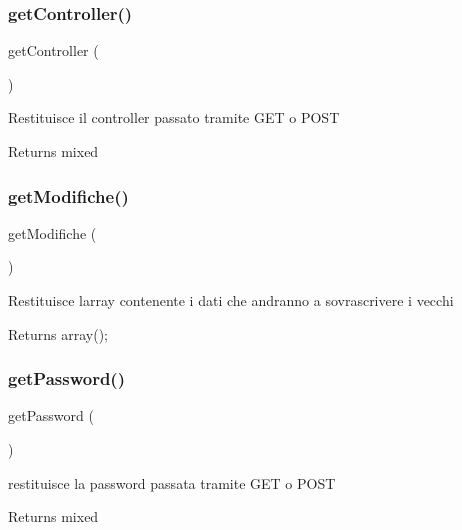 \subsubsection{\texorpdfstring{get\+Controller()}{getController()}}
{\footnotesize\ttfamily get\+Controller (\begin{DoxyParamCaption}{ }\end{DoxyParamCaption})}

Restituisce il controller passato tramite G\+ET o P\+O\+ST

\begin{DoxyReturn}{Returns}
mixed 
\end{DoxyReturn}
\mbox{\label{class_v_utente_ad153372cfab6f86800a89b5a378d9760}} 
\subsubsection{\texorpdfstring{get\+Modifiche()}{getModifiche()}}
{\footnotesize\ttfamily get\+Modifiche (\begin{DoxyParamCaption}{ }\end{DoxyParamCaption})}

Restituisce l\textquotesingle{}array contenente i dati che andranno a sovrascrivere i vecchi

\begin{DoxyReturn}{Returns}
array(); 
\end{DoxyReturn}
\mbox{\label{class_v_utente_a04e0957baeb7acde9c0c86556da2d43f}} 
\subsubsection{\texorpdfstring{get\+Password()}{getPassword()}}
{\footnotesize\ttfamily get\+Password (\begin{DoxyParamCaption}{ }\end{DoxyParamCaption})}

restituisce la password passata tramite G\+ET o P\+O\+ST

\begin{DoxyReturn}{Returns}
mixed 
\end{DoxyReturn}
\mbox{\label{class_v_utente_a13871c4434338f02d6f8d430fa0597f2}} 
